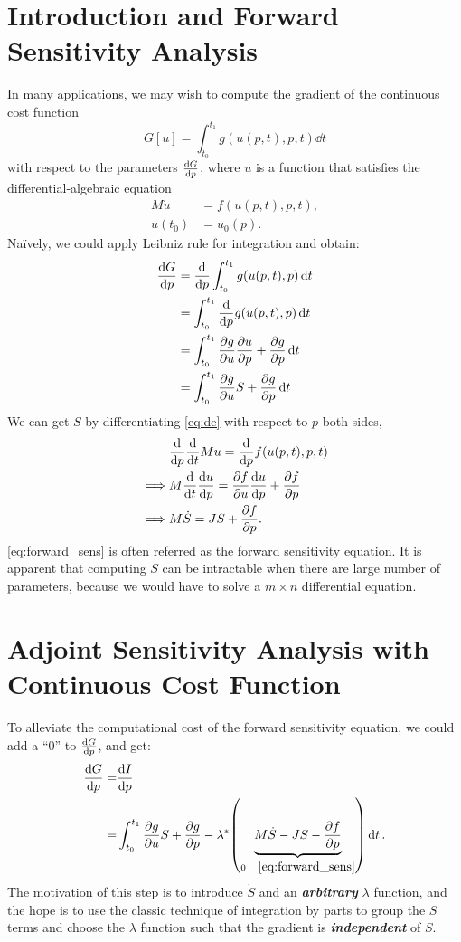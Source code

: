 \documentclass[a4paper,9pt]{article}
\theoremstyle{definition}
\theoremstyle{remark}
\begin{document}
\section{Introduction and Forward Sensitivity Analysis}
In many applications, we may wish to compute the gradient of the continuous cost
function
\begin{equation}
  G[u] = \int_{t_0}^{t_1} g(u(p, t), p, t) \dd{t}
\end{equation}
with respect to the parameters $\dv{G}{p}$, where $u$ is a function that
satisfies the differential-algebraic equation
\begin{align} \label{eq:de}
  M\dot{u} &= f(u(p, t), p, t), \\
  u(t_0) &= u_0(p).
\end{align}
Na\"ively, we could apply Leibniz rule for integration and obtain:
\begin{align}
  \dv{G}{p} &= \dv{p} \int_{t_0}^{t_1} g(u(p, t), p) \dd{t} \\
            &= \int_{t_0}^{t_1} \dv{p} g(u(p, t), p) \dd{t} \\
            &= \int_{t_0}^{t_1} \pdv{g}{u}\pdv{u}{p} + \pdv{g}{p} \dd{t} \\
            &= \int_{t_0}^{t_1} \pdv{g}{u}S + \pdv{g}{p} \dd{t}
            \label{eq:dgdp}
\end{align}
We can get $S$ by differentiating \cref{eq:de} with respect to $p$ both sides,
\begin{align}
  &\dv{p}\dv{t}Mu = \dv{p}f(u(p, t), p, t) \\
  \implies &M\dv{t}\dv{u}{p} = \pdv{f}{u}\dv{u}{p} + \pdv{f}{p} \\
  \implies &M\dot{S} = JS + \pdv{f}{p} \label{eq:forward_sens}.
\end{align}
\cref{eq:forward_sens} is often referred as the forward sensitivity equation.
It is apparent that computing $S$ can be intractable when there are large number
of parameters, because we would have to solve a $m\times n$ differential
equation.

\section{Adjoint Sensitivity Analysis with Continuous Cost Function}
To alleviate the computational cost of the forward sensitivity equation, we
could add a ``$0$'' to $\dv{G}{p}$, and get:
\begin{align}
  \dv{G}{p} = &\dv{I}{p} \\
  = &\int_{t_0}^{t_1} \pdv{g}{u}S + \pdv{g}{p} -
  \lambda^*\qty(\underbrace{M\dot{S} -
  JS - \pdv{f}{p}}_{0 \quad\cref{eq:forward_sens}}) \dd{t}.
\end{align}
The motivation of this step is to introduce $\dot{S}$ and an
\textbf{\emph{arbitrary}} $\lambda$ function, and the hope is to use the classic
technique of integration by parts to group the $S$ terms and choose the
$\lambda$ function such that the gradient is \textbf{\emph{independent}} of
$S$.
\end{document}
